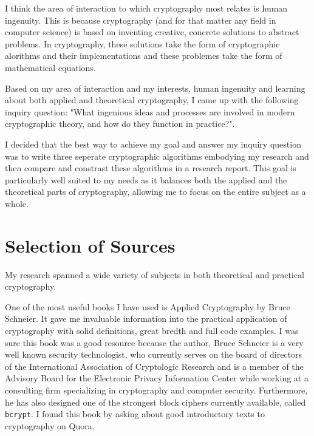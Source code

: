 \documentclass[12pt, a4paper, draft]{report}
\begin{document}
I think the area of interaction to which cryptography most relates is
human ingenuity. This is because cryptography (and for that matter any
field in computer science) is based on inventing creative, concrete
solutions to abstract problems. In cryptography, these solutions
take the form of cryptographic alorithms and their implementations
and these problemes take the form of mathematical equations.

Based on my area of interaction and my interests, human ingenuity and
learning about both applied and theoretical cryptography, I came up with the
following inquiry question: "What ingenious ideas and processes are involved
in modern cryptographic theory, and how do they function in practice?".

I decided that the best way to achieve my goal and answer my inquiry
question was to write three seperate cryptographic algorithms embodying
my research and then compare and constrast these algorithms in a research
report. This goal is particularly well suited to my needs as it balances
both the applied and the theoretical parts of cryptography, allowing me to
focus on the entire subject as a whole.


\section{Selection of Sources}

My research spanned a wide variety of subjects in both theoretical and
practical cryptography.

One of the most useful books I have used is Applied Cryptography
by Bruce Schneier\footnotemark. It gave me invaluable information into the
practical application of cryptography with solid definitions,
great bredth and full code examples. I was sure this book was a good
resource because the author, Bruce Schneier is a very well known
security technologist, who currently serves on the board of directors
of the International Association of Cryptologic Research and is a member
of the Advisory Board for the Electronic Privacy Information Center while
working at a consulting firm specializing in cryptography and computer
security. Furthermore, he has also designed one of the strongest block
ciphers currently available, called \texttt{bcrypt}. I found this book
by asking about good introductory texts to cryptography on Quora.
\end{document}
